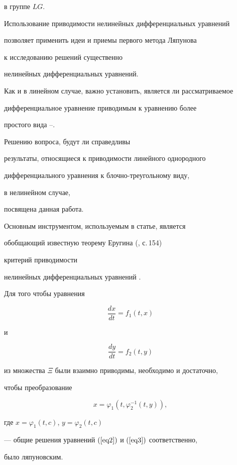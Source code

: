 в группе $LG$.





Использование приводимости нелинейных дифференциальных уравнений


позволяет применить идеи и приемы первого метода Ляпунова


к исследованию решений существенно 


нелинейных дифференциальных уравнений.


Как и в линейном случае, важно установить, является ли рассматриваемое 


дифференциальное уравнение приводимым к уравнению более


простого вида \cite{VoskrGr}--\cite{PashDu}.


Решению вопроса, будут ли справедливы


результаты, относящиеся к приводимости линейного однородного


дифференциального уравнения к блочно-треугольному виду, 


в нелинейном случае,


посвящена данная работа.





Основным инструментом, используемым в статье, является


обобщающий известную теорему Еругина (\cite{DemLe}, с.\,154)


критерий приводимости


нелинейных дифференциальных уравнений \cite{VoskrOp}.





\begin{thm}


Для того чтобы уравнения


\begin{equation}


\label{eq2}


\frac{d x}{d t}=f_1(t,x)


\end{equation}


и


\begin{equation}


\label{eq3}


\frac{d y}{d t}=f_2(t,y)


\end{equation}


из множества $\Xi$ были взаимно приводимы, необходимо и достаточно,


чтобы преобразование


$$


x=\varphi_1(t,\varphi^{-1}_2(t,y)),


$$


где $x=\varphi_1(t,c)$, $y=\varphi_2(t,c)$


--- общие решения уравнений $(\ref{eq2})$ и $(\ref{eq3})$ соответственно,


было ляпуновским.


\end{thm}





